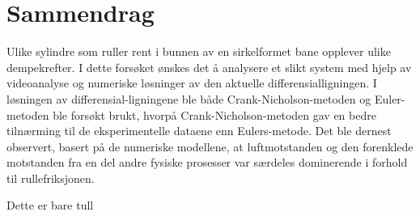
\section{Sammendrag}
Ulike sylindre som ruller rent i bunnen av en sirkelformet bane opplever ulike dempekrefter.
I dette forsøket ønskes det å analysere et slikt system med hjelp av videoanalyse og numeriske løsninger av den aktuelle differensial\-ligningen. I løsningen av differensial-ligningene ble både Crank-Nicholson-metoden og Euler-metoden ble forsøkt brukt, hvorpå Crank-Nicholson-metoden gav en bedre tilnærming til de eksperimentelle dataene enn Eulers-metode. Det ble dernest observert, basert på de numeriske modellene, at luftmotstanden og den forenklede motstanden fra en del andre fysiske prosesser var særdeles dominerende i forhold til rullefriksjonen.

Dette er bare tull
